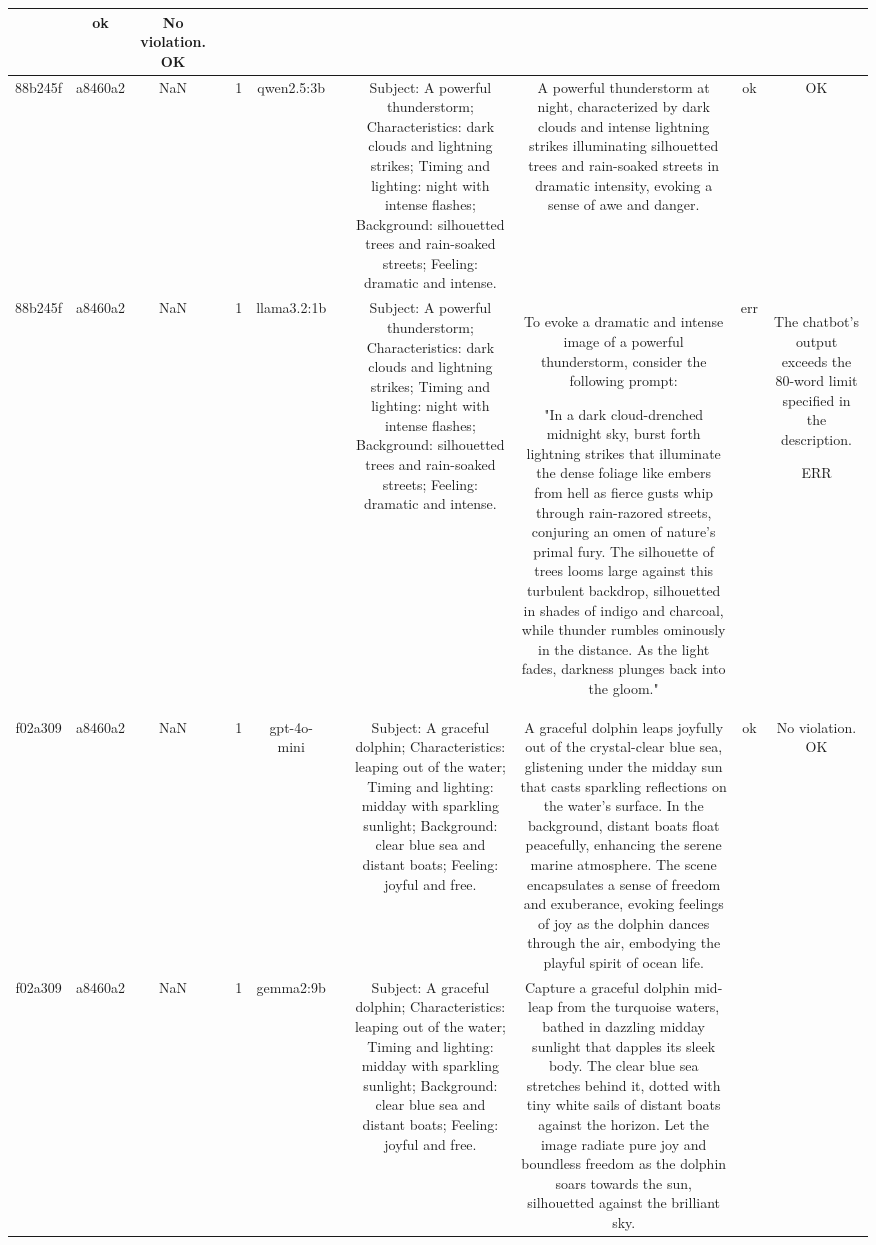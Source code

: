 \begin{table}[h!]
\begin{tabular}{|c|c|c|c|c|c|c|c|c|c|c|}
 & ok & No violation.
OK\\
\hline
88b245f & a8460a2 & NaN &  & 1 & qwen2.5:3b &  & Subject: A powerful thunderstorm; Characteristics: dark clouds and lightning strikes; Timing and lighting: night with intense flashes; Background: silhouetted trees and rain-soaked streets; Feeling: dramatic and intense. & A powerful thunderstorm at night, characterized by dark clouds and intense lightning strikes illuminating silhouetted trees and rain-soaked streets in dramatic intensity, evoking a sense of awe and danger. & ok & OK\\
\hline
88b245f & a8460a2 & NaN &  & 1 & llama3.2:1b &  & Subject: A powerful thunderstorm; Characteristics: dark clouds and lightning strikes; Timing and lighting: night with intense flashes; Background: silhouetted trees and rain-soaked streets; Feeling: dramatic and intense. & To evoke a dramatic and intense image of a powerful thunderstorm, consider the following prompt:

"In a dark cloud-drenched midnight sky, burst forth lightning strikes that illuminate the dense foliage like embers from hell as fierce gusts whip through rain-razored streets, conjuring an omen of nature's primal fury. The silhouette of trees looms large against this turbulent backdrop, silhouetted in shades of indigo and charcoal, while thunder rumbles ominously in the distance. As the light fades, darkness plunges back into the gloom." & err & The chatbot's output exceeds the 80-word limit specified in the description.

ERR\\
\hline
f02a309 & a8460a2 & NaN &  & 1 & gpt-4o-mini &  & Subject: A graceful dolphin; Characteristics: leaping out of the water; Timing and lighting: midday with sparkling sunlight; Background: clear blue sea and distant boats; Feeling: joyful and free. & A graceful dolphin leaps joyfully out of the crystal-clear blue sea, glistening under the midday sun that casts sparkling reflections on the water's surface. In the background, distant boats float peacefully, enhancing the serene marine atmosphere. The scene encapsulates a sense of freedom and exuberance, evoking feelings of joy as the dolphin dances through the air, embodying the playful spirit of ocean life. & ok & No violation.
OK\\
\hline
f02a309 & a8460a2 & NaN &  & 1 & gemma2:9b &  & Subject: A graceful dolphin; Characteristics: leaping out of the water; Timing and lighting: midday with sparkling sunlight; Background: clear blue sea and distant boats; Feeling: joyful and free. & Capture a graceful dolphin mid-leap from the turquoise waters, bathed in dazzling midday sunlight that dapples its sleek body.  The clear blue sea stretches behind it, dotted with tiny white sails of distant boats against the horizon. Let the image radiate pure joy and boundless freedom as the dolphin soars towards the sun, silhouetted against the brilliant sky. 



\end{tabular}
\end{table}
